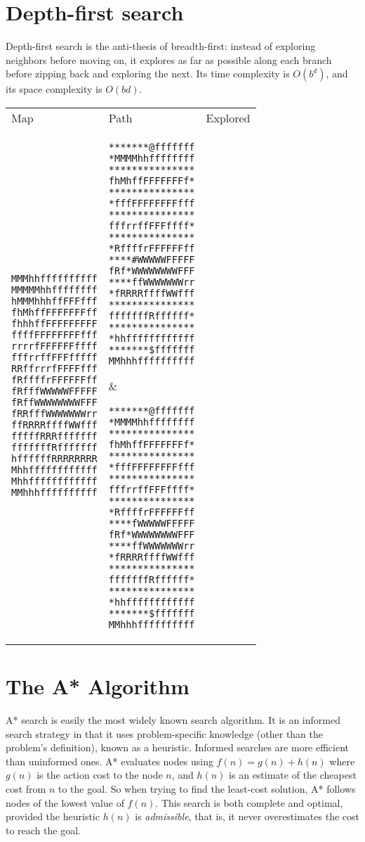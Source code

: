 \documentclass[12pt, article]{scrartcl}
\begin{document}
\section{Depth-first search}
Depth-first search is the anti-thesis of breadth-first: instead of exploring neighbors before moving on, it explores as far as possible along each branch before zipping back and exploring the next. Its time complexity is $O(b^d)$, and its space complexity is $O(bd)$.
\begin{tabular}{p{2in} p{2in} p{2in}}
Map & Path & Explored \\

\begin{verbatim}
MMMhhffffffffff
MMMMMhhffffffff
hMMMhhhffFFFfff
fhMhffFFFFFFFff
fhhhffFFFFFFFFF
ffffFFFFFFFFfff
rrrrfFFFFFFffff
fffrrffFFFfffff
RRffrrrfFFFFfff
fRffffrFFFFFFff
fRfffWWWWWFFFFF
fRffWWWWWWWWFFF
fRRfffWWWWWWWrr
ffRRRRffffWWfff
fffffRRRfffffff
fffffffRfffffff
hffffffRRRRRRRR
Mhhffffffffffff
Mhhffffffffffff
MMhhhffffffffff
\end{verbatim}
&
\begin{verbatim}
*******@fffffff
*MMMMhhffffffff
***************
fhMhffFFFFFFFf*
***************
*fffFFFFFFFFfff
***************
fffrrffFFFffff*
***************
*RffffrFFFFFFff
****#WWWWWFFFFF
fRf*WWWWWWWWFFF
****ffWWWWWWWrr
*fRRRRffffWWfff
***************
fffffffRffffff*
***************
*hhffffffffffff
*******$fffffff
MMhhhffffffffff
\end{verbatim}
&
\begin{verbatim}
*******@fffffff
*MMMMhhffffffff
***************
fhMhffFFFFFFFf*
***************
*fffFFFFFFFFfff
***************
fffrrffFFFffff*
***************
*RffffrFFFFFFff
****fWWWWWFFFFF
fRf*WWWWWWWWFFF
****ffWWWWWWWrr
*fRRRRffffWWfff
***************
fffffffRffffff*
***************
*hhffffffffffff
*******$fffffff
MMhhhffffffffff
\end{verbatim}
\end{tabular}

\section{The A* Algorithm}
A* search is easily the most widely known search algorithm. It is an informed search strategy in that it uses problem-specific knowledge (other than the problem's definition), known as a heuristic. Informed searches are more efficient than uninformed ones. A* evaluates nodes using $f(n) = g(n) + h(n)$ where $g(n)$ is the action cost to the node $n$, and $h(n)$ is an estimate of the cheapest cost from $n$ to the goal. So when trying to find the least-cost solution, A* follows nodes of the lowest value of $f(n)$. This search is both complete and optimal, provided the heuristic $h(n)$ is \emph{admissible}, that is, it never overestimates the cost to reach the goal. \\
\end{document}
